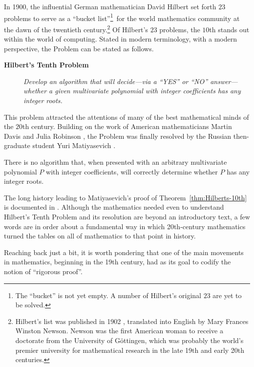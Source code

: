 In 1900, the influential German mathematician David Hilbert
 set forth $23$ problems to serve as a ``bucket
list''\footnote{The ``bucket'' is not yet empty.  A number of Hilbert's
  original $23$ are yet to be solved.}~for the world mathematics
community at the dawn of the twentieth century.\footnote{Hilbert's
  list was published in 1902 \cite{Hilbert02}, translated into English
  by Mary Frances Winston Newson. 
  Newson was the first American woman to receive a doctorate from the
  University of G\"{o}ttingen, which was probably the world's premier
  university for mathematical research in the late 19th and early 20th
  centuries.}  Of Hilbert's $23$ problems, the $10$th stands out
within the world of computing.  Stated
in modern terminology, with a modern perspective, the Problem can be
stated as follows.
\begin{description}
\item[{\bf Hilbert's Tenth Problem}]
{\it Develop an algorithm that will decide---via a ``YES'' or ``NO''
  answer---whether a given multivariate polynomial with integer
  coefficients has any integer roots.  }
\end{description}
This problem attracted the attentions of many of the best mathematical
minds of the $20$th century.  Building on the work of American
mathematicians Martin Davis  and Julia Robinson
, the Problem was finally resolved by the Russian
then-graduate student Yuri Matiyasevich .

\begin{theorem}
\label{thm:Hilberts-10th}
There is no algorithm that, when presented with an arbitrary
multivariate polynomial $P$ with integer coefficients, will correctly
determine whether $P$ has any integer roots.
\end{theorem}

The long history leading to Matiyasevich's proof of
Theorem~\ref{thm:Hilberts-10th} is documented in
\cite{Davis73,DavisH73,DavisMR76,Matiyasevich93}.  Although the
mathematics needed even to understand Hilbert's Tenth Problem and its
resolution are beyond an introductory text, a few words are in order
about a fundamental way in which 20th-century mathematics turned the
tables on all of mathematics to that point in history.

Reaching back just a bit, it is worth pondering that one of the main
movements in mathematics, beginning in the 19th century, had as its
goal to codify the notion of ``rigorous proof''.
\bigskip

